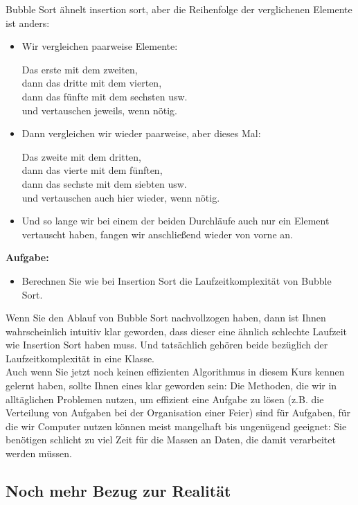 Bubble Sort ähnelt insertion sort, aber die Reihenfolge der verglichenen Elemente ist anders:

\begin{itemize}
	\item Wir vergleichen paarweise Elemente:
	
	Das erste mit dem zweiten,\\
	dann das dritte mit dem vierten,\\
	dann das fünfte mit dem sechsten usw.\\
	und vertauschen jeweils, wenn nötig.
	
	\item Dann vergleichen wir wieder paarweise, aber dieses Mal:
	
	Das zweite mit dem dritten,\\
	dann das vierte mit dem fünften,\\
	dann das sechste mit dem siebten usw.\\
	und vertauschen auch hier wieder, wenn nötig.
	
	\item Und so lange wir bei einem der beiden Durchläufe auch nur ein Element vertauscht haben, fangen wir anschließend wieder von vorne an.
\end{itemize}

\textbf{Aufgabe:}

\begin{itemize}
	\item Berechnen Sie wie bei Insertion Sort die Laufzeitkomplexität von Bubble Sort.
\end{itemize}

Wenn Sie den Ablauf von Bubble Sort nachvollzogen haben, dann ist Ihnen wahrscheinlich intuitiv klar geworden, dass dieser eine ähnlich schlechte Laufzeit wie Insertion Sort haben muss. Und tatsächlich gehören beide bezüglich der Laufzeitkomplexität in eine Klasse.\\

Auch wenn Sie jetzt noch keinen effizienten Algorithmus in diesem Kurs kennen gelernt haben, sollte Ihnen eines klar geworden sein: Die Methoden, die wir in alltäglichen Problemen nutzen, um effizient eine Aufgabe zu lösen (z.B. die Verteilung von Aufgaben bei der Organisation einer Feier) sind für Aufgaben, für die wir Computer nutzen können meist mangelhaft bis ungenügend geeignet: Sie benötigen schlicht zu viel Zeit für die Massen an Daten, die damit verarbeitet werden müssen.

\subsection{Noch mehr Bezug zur Realität}


